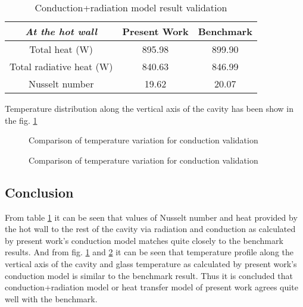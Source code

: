 \begin{table}[H]
\centering
\caption{Conduction+radiation model result validation}
\label{tab:conductionRadiationModelResultValidation}
\begin{tabular}{@{}|c|c|c|@{}}
\toprule
\textit{\textbf{At the hot wall}} & \textbf{Present Work} & \textbf{Benchmark} \\ \midrule
Total heat (W)                    & 895.98                & 899.90             \\ \midrule
Total radiative heat (W)          & 840.63                & 846.99             \\ \midrule
Nusselt number                    & 19.62                 & 20.07              \\ \bottomrule
\end{tabular}
\end{table}

Temperature distribution along the vertical axis of the cavity has been show in the fig. \ref{fig:validationConductionRadiation}

\begin{figure}[H]
\centering     %
{}
\caption{Comparison of temperature variation for conduction validation}
\label{fig:validationConductionRadiation}
\end{figure}

\begin{figure}[H]
\centering     %
{}
\caption{Comparison of temperature variation for conduction validation}
\label{fig:validationConductionRadiationGlass}
\end{figure}

\subsection{Conclusion}

From table \ref{tab:conductionRadiationModelResultValidation} it can be seen that values of Nusselt number and heat provided by the hot wall to the rest of the cavity via radiation and conduction as calculated by present work's conduction model matches quite closely to the benchmark results. And from fig. \ref{fig:validationConductionRadiation} and \ref{fig:validationConductionRadiationGlass} it can be seen that temperature profile along the vertical axis of the cavity and glass temperature as calculated by present work's conduction model is similar to the benchmark result. Thus it is concluded that conduction+radiation model or heat transfer model of present work agrees quite well with the benchmark.

